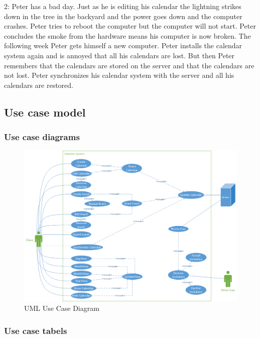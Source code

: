 2:
Peter has a bad day. Just as he is editing his calendar the lightning strikes down in the tree in the backyard and the power goes down and the computer crashes. Peter tries to reboot the computer but the computer will not start. Peter concludes the smoke from the hardware means his computer is now broken. The following week Peter gets himself a new computer. Peter installs the calendar system again and is annoyed that all his calendars are lost. But then Peter remembers that the calendars are stored on the server and that the calendars are not lost.
Peter synchronizes his calendar system with the server and all his calendars are restored.

\pagebreak

\subsection*{Use case model}

\subsubsection{Use case diagrams}

\begin{figure}[ht!]
\centering
\includegraphics[width=160mm]{usecase.png}
\caption{UML Use Case Diagram \label{overflow}}
\end{figure}

\pagebreak

\subsubsection{Use case tabels}

